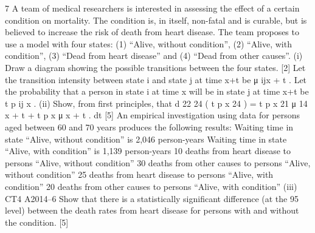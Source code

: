 \documentclass[a4paper,12pt]{article}
\begin{document}
\begin{enumerate}
7
A team of medical researchers is interested in assessing the effect of a certain
condition on mortality. The condition is, in itself, non-fatal and is curable, but is
believed to increase the risk of death from heart disease. The team proposes to use a
model with four states: (1) “Alive, without condition”, (2) “Alive, with condition”,
(3) “Dead from heart disease” and (4) “Dead from other causes”.
(i)
Draw a diagram showing the possible transitions between the four states.
[2]
Let the transition intensity between state i and state j at time x+t be μ ijx + t . Let the
probability that a person in state i at time x will be in state j at time x+t be t p ij x .
(ii)
Show, from first principles, that
d
22 24
( t p x 24 ) = t p x 21 μ 14
x + t + t p x μ x + t .
dt
[5]
An empirical investigation using data for persons aged between 60 and 70 years
produces the following results:
Waiting time in state “Alive, without condition” is 2,046 person-years
Waiting time in state “Alive, with condition” is 1,139 person-years
10 deaths from heart disease to persons “Alive, without condition”
30 deaths from other causes to persons “Alive, without condition”
25 deaths from heart disease to persons “Alive, with condition”
20 deaths from other causes to persons “Alive, with condition”
(iii)
CT4 A2014–6
Show that there is a statistically significant difference (at the 95%
level) between the death rates from heart disease for persons with and without
the condition.
[5]


\end{enumerate}
\end{document}
